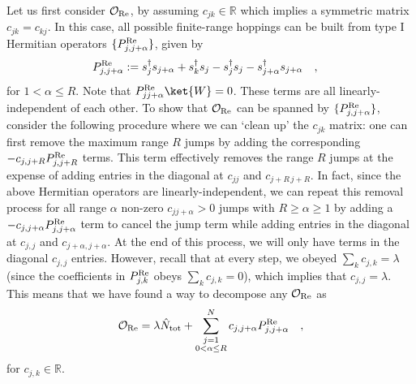 \documentclass[prx,letterpaper,aps,superscriptaddress,floatfix,twocolumn,nofootinbib]{revtex4-2}
\theoremstyle{definition}
\begin{document}
    Let us first consider $\mathcal{O}_{\rm Re}$, by assuming $c_{jk}\in \mathbb{R}$ which implies a symmetric matrix $c_{jk}=c_{kj}$.
    In this case, all possible finite-range hoppings can be built from type I Hermitian operators $\{P_{j,j+\alpha}^{\rm Re}\}$, given by
    \begin{align}
        P_{j,j+\alpha}^{\rm Re}&:= s_j^\dag s_{j+\alpha}+s_k^\dag s_j-s_j^\dag s_j-s_{j+\alpha}^\dag s_{j+\alpha}\quad,
        \label{eq:PRe}
    \end{align}
    for $1<\alpha\leq R$.
    Note that $P_{jj+\alpha}^{\rm Re}\ket{W}=0$. These terms are all linearly-independent of each other.
    To show that $\mathcal{O}_{\rm Re}$ can be spanned by $\{P_{j,j+\alpha}^{\rm Re}\}$, consider the following procedure where we can `clean up' the $c_{jk}$ matrix: one can first remove the maximum range $R$ jumps by adding the corresponding $-c_{j,j+R}P_{j,j+R}^{\rm Re}$ terms.
    This term effectively removes the range $R$ jumps at the expense of adding entries in the diagonal at $c_{jj}$ and $c_{j+R \,j+R}$.
    In fact, since the above Hermitian operators are linearly-independent, we can repeat this removal process for all range $\alpha$ non-zero $c_{jj+\alpha}>0$ jumps with $R\geq\alpha\geq 1$ by adding a $-c_{j,j+\alpha}P_{j,j+\alpha}^{\rm Re}$ term to cancel the jump term while adding entries in the diagonal at $c_{j,j}$ and $c_{j+\alpha, j+\alpha}$.
    At the end of this process, we will only have terms in the diagonal $c_{j,j}$ entries. However, recall that at every step, we obeyed $\sum_k c_{j,k}=\lambda$ (since the coefficients in $P_{j,k}^{\rm Re}$ obeys $\sum_k c_{j,k}=0$), which implies that $c_{j,j}=\lambda$. This means that we have found a way to decompose any $\mathcal{O}_{\rm Re}$ as
    \begin{align}
        \mathcal{O}_{\rm Re}
        =\lambda \hat{N}_{\rm tot}+\sum^N_{\substack{j=1\\0<\alpha\leq R}} c_{j,j+\alpha}P_{j,j+\alpha}^{\rm Re}\quad,
        \label{eq:ORehop}
    \end{align}
    for $c_{j,k}\in \mathbb{R}$.
\end{document}
